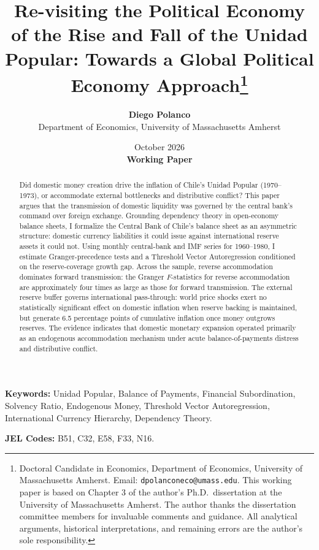 \documentclass[11pt]{article}
\title{\textbf{Re-visiting the Political Economy of the Rise and Fall of the Unidad Popular: Towards a Global Political Economy Approach}\thanks{Doctoral Candidate in Economics, Department of Economics, University of Massachusetts Amherst. Email: \texttt{dpolanconeco@umass.edu}. This working paper is based on Chapter 3 of the author's Ph.D.\ dissertation at the University of Massachusetts Amherst. The author thanks the dissertation committee members for invaluable comments and guidance. All analytical arguments, historical interpretations, and remaining errors are the author's sole responsibility.}}
\author{\textbf{Diego Polanco} \\
Department of Economics, University of Massachusetts Amherst}
\date{October 2026 \\ \vspace{0.5em} \small\textbf{Working Paper}}
\begin{document}
\maketitle

\begin{abstract}
Did domestic money creation drive the inflation of Chile's Unidad Popular
(1970--1973), or accommodate external bottlenecks and distributive conflict?
This paper argues that the transmission of domestic liquidity was governed by
the central bank's command over foreign exchange. Grounding dependency theory
in open-economy balance sheets, I formalize the Central Bank of Chile's balance
sheet as an asymmetric structure: domestic currency liabilities it could issue
against international reserve assets it could not. Using monthly central-bank
and IMF series for 1960--1980, I estimate Granger-precedence tests and a
Threshold Vector Autoregression conditioned on the reserve-coverage growth gap.
Across the sample, reverse accommodation dominates forward transmission: the
Granger $F$-statistics for reverse accommodation are approximately four times
as large as those for forward transmission. The external reserve buffer governs international
pass-through: world price shocks exert no statistically significant effect on
domestic inflation when reserve backing is maintained, but generate 6.5
percentage points of cumulative inflation once money outgrows reserves. The
evidence indicates that domestic monetary expansion operated primarily as an
endogenous accommodation mechanism under acute balance-of-payments distress and
distributive conflict.
\end{abstract}

\vspace{0.8em}
\noindent\textbf{Keywords:} Unidad Popular, Balance of Payments, Financial
Subordination, Solvency Ratio, Endogenous Money, Threshold Vector
Autoregression, International Currency Hierarchy, Dependency Theory.

\vspace{0.4em}
\noindent\textbf{JEL Codes:} B51, C32, E58, F33, N16.

\clearpage








\clearpage
\begingroup
\setlength{\bibsep}{2.5pt}


\endgroup

\clearpage
\begin{appendices}





\end{appendices}
\end{document}
